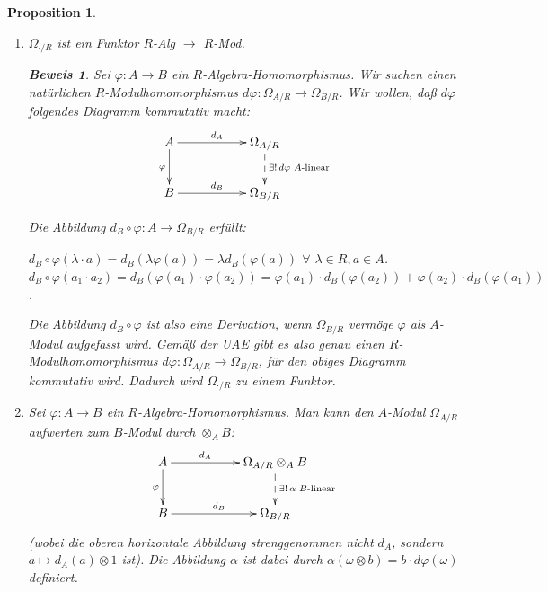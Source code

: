 \documentclass[a4paper,12pt]{scrbook}
\theoremstyle{break}
\newtheorem{Prop}[Def]{Proposition}
\theoremstyle{nonumberbreak}
\newtheorem{Bew}{Beweis}
\theoremstyle{nonumberplain}
\begin{document}
\begin{Prop}
\begin{enumerate}
\item[a)]
$\Omega_{\cdot/R}$ ist ein Funktor \underline{$R$-Alg} $\rightarrow$ \underline{$R$-Mod}.

\begin{Bew}
Sei $\varphi: A \rightarrow B$ ein $R$-Algebra-Homomorphismus. Wir suchen einen natürlichen $R$-Modulhomomorphismus $d\varphi : \Omega_{A/R} \to \Omega_{B/R}$.
Wir wollen, daß $d\varphi$ folgendes Diagramm kommutativ macht:
$$
\begin{xy}
\xymatrix{
A \ar[rr]^{d_A} \ar[d]_{\varphi} & & \ar@{-->}[d]^{\exists!\, d\varphi \text{ $A$-linear}} \Omega_{A/R} \\
B \ar[rr]^{d_B}                  & & \Omega_{B/R}
}
\end{xy}
$$

Die Abbildung $d_B \circ \varphi : A \rightarrow \Omega_{B/R}$ erfüllt:

$d_B \circ \varphi(\lambda \cdot a) = d_B(\lambda \varphi(a)) = \lambda d_B(\varphi(a))$ $\forall$ $\lambda \in R, a \in A$.\\
$d_B \circ \varphi(a_1 \cdot a_2) = d_B(\varphi(a_1) \cdot \varphi(a_2)) = \varphi(a_1) \cdot d_B(\varphi(a_2)) + \varphi(a_2) \cdot d_B(\varphi(a_1))$.

Die Abbildung $d_B \circ \varphi$ ist also eine Derivation, wenn $\Omega_{B/R}$ vermöge $\varphi$ als $A$-Modul aufgefasst wird. Gemäß der UAE gibt es also genau einen $R$-Modulhomomorphismus $d\varphi : \Omega_{A/R} \to \Omega_{B/R}$, für den obiges Diagramm kommutativ wird. Dadurch wird $\Omega_{\cdot /R}$ zu einem Funktor.
\end{Bew}

\item[b)] Sei $\varphi: A \rightarrow B$ ein $R$-Algebra-Homomorphismus. 
Man kann den $A$-Modul $\Omega_{A/R}$ aufwerten zum $B$-Modul durch $\otimes_A B$:
$$
\begin{xy}
\xymatrix{
A \ar[rr]^-{d_A} \ar[d]_{\varphi}  & & \ar@{-->}[d]^{\exists!\, \alpha \text{ $B$-linear}} \Omega_{A/R} \otimes_A B \\
B \ar[rr]^{d_B}                   & & \Omega_{B/R}
}
\end{xy}
$$
(wobei die oberen horizontale Abbildung strenggenommen nicht $d_A$, sondern
$a\mapsto d_A\left(a\right)\otimes 1$ ist).
Die Abbildung $\alpha$ ist dabei durch $\alpha\left(\omega \otimes b\right) = b \cdot d\varphi(\omega)$ definiert. \\


\end{enumerate}
\end{Prop}
\end{document}
